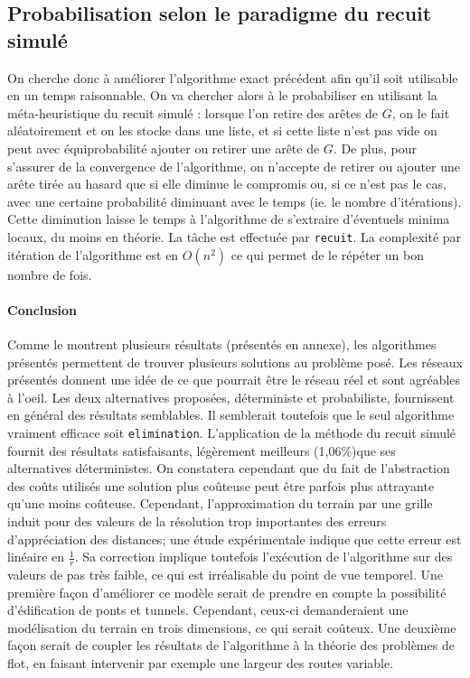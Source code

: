 \documentclass[french]{article}
\begin{document}
			\subsection{Probabilisation selon le paradigme du recuit simulé}

				On cherche donc à améliorer l'algorithme exact précédent afin qu'il soit utilisable en un temps raisonnable. On va chercher alors à le probabiliser en utilisant la méta-heuristique du recuit simulé : lorsque l'on retire des arêtes de $G$, on le fait aléatoirement et on les stocke dans une liste, et si cette liste n'est pas vide on peut avec équiprobabilité ajouter ou retirer une arête de $G$. De plus, pour s'assurer de la convergence de l'algorithme, on n'accepte de retirer ou ajouter une arête tirée au hasard que si elle diminue le compromis ou, si ce n'est pas le cas, avec une certaine probabilité diminuant avec le temps (ie. le nombre d'itérations). Cette diminution laisse le temps à l'algorithme de s'extraire d'éventuels minima locaux, du moins en théorie. La tâche est effectuée par \verb?recuit?. La complexité par itération de l'algorithme est en $O(n^{2})$ ce qui permet de le répéter un bon nombre de fois.

	\paragraph{Conclusion}

		Comme le montrent plusieurs résultats (présentés en annexe), les algorithmes présentés permettent de trouver plusieurs solutions au problème posé. Les réseaux présentés donnent une idée de ce que pourrait être le réseau réel et sont agréables à l'oeil.\newline
		Les deux alternatives proposées, déterministe et probabiliste, fournissent en général des résultats semblables. Il semblerait toutefois que le seul algorithme vraiment efficace soit \verb?elimination?. L'application de la méthode du recuit simulé fournit des résultats satisfaisants, légèrement meilleurs (1,06\%)que ses alternatives déterministes. On constatera cependant que du fait de l'abstraction des coûts utilisés une solution plus coûteuse peut être parfois plus attrayante qu'une moins coûteuse. \newline
		Cependant, l'approximation du terrain par une grille induit pour des valeurs de la résolution trop importantes des erreurs d'appréciation des distances; une étude expérimentale indique que cette erreur est linéaire en $\frac{1}{r}$. Sa correction implique toutefois l'exécution de l'algorithme sur des valeurs de pas très faible, ce qui est irréalisable du point de vue temporel. \newline
		Une première façon d'améliorer ce modèle serait de prendre en compte la possibilité d'édification de ponts et tunnels. Cependant, ceux-ci demanderaient une modélisation du terrain en trois dimensions, ce qui serait coûteux.\newline
		Une deuxième façon serait de coupler les résultats de l'algorithme à la théorie des problèmes de flot, en faisant intervenir par exemple une largeur des routes variable.
\end{document}
